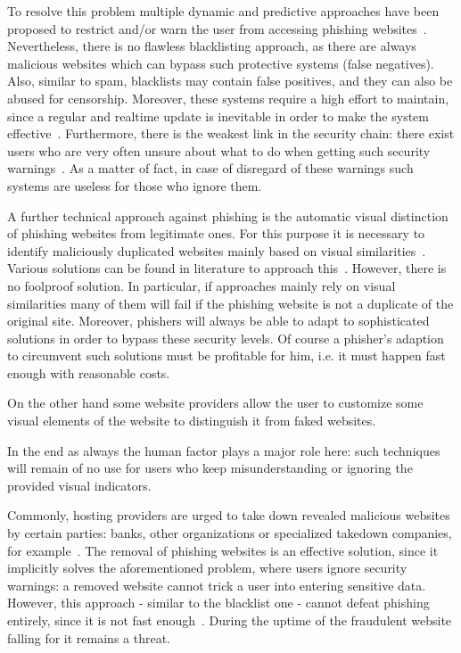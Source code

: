 \begin{description}[leftmargin=0cm]
 To resolve this problem multiple dynamic and predictive approaches have been proposed to restrict and/or warn the user from accessing phishing websites~\cite{prakash2010phishnet, obied2009fraudulent, balzarotti2012proactive}. Nevertheless, there is no flawless blacklisting approach, as there are always malicious websites which can bypass such protective systems (false negatives). Also, similar to spam, blacklists may contain false positives, and they can also be abused for censorship.
 Moreover, these systems require a high effort to maintain, since a regular and realtime update is inevitable in order to make the system effective~\cite{purkait2012phishing}. Furthermore, there is the weakest link in the security chain: there exist users who are very often unsure about what to do when getting such security warnings~\cite{bakhshi2009social}. As a matter of fact, in case of disregard of these warnings such systems are useless for those who ignore them. 
	\item[Visual distinction] A further technical approach against phishing is the automatic visual distinction of phishing websites from legitimate ones.
 For this purpose it is necessary to identify maliciously duplicated websites mainly based on visual similarities~\cite{liu2006antiphishing}. Various solutions can be found in literature to approach this~\cite{chen2009fighting,chen2010detecting,zhang2011textual}. However, there is no foolproof solution.
 In particular, if approaches mainly rely on visual similarities many of them will fail if the phishing website is not a duplicate of the original site.
 Moreover, phishers will always be able to adapt to sophisticated solutions in order to bypass these security levels. 
Of course a phisher's adaption to circumvent such solutions must be profitable for him, i.e. it must happen fast enough with reasonable costs.

On the other hand some website providers allow the user to customize some visual elements of the website to distinguish it from faked websites.
 
In the end as always the human factor plays a major role here: such techniques will remain of no use for users who keep misunderstanding or ignoring the provided visual indicators.

	\item[Takedown] Commonly, hosting providers are urged to take down revealed malicious websites by certain parties: banks, other organizations or specialized takedown companies, for example~\cite{moore2007examining}. The removal of phishing websites is an effective solution, since it implicitly solves the aforementioned problem, where users ignore security warnings: a removed website cannot trick a user into entering sensitive data.
 However, this approach - similar to the blacklist one - cannot defeat phishing entirely, since it is not fast enough~\cite{moore2007examining}. During the uptime of the fraudulent website falling for it remains a threat.

\end{description}

